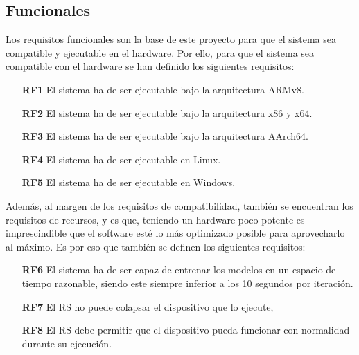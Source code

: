 \subsection{Funcionales}
Los requisitos funcionales son la base de este proyecto para que el sistema sea compatible y ejecutable en el hardware. Por ello, para que el sistema sea compatible con el hardware se han definido los siguientes requisitos:
\begin{itemize}
    \item [\textbf{RF1}] El sistema ha de ser ejecutable bajo la arquitectura ARMv8.
    \item [\textbf{RF2}] El sistema ha de ser ejecutable bajo la arquitectura x86 y x64.
    \item [\textbf{RF3}] El sistema ha de ser ejecutable bajo la arquitectura AArch64.
    \item [\textbf{RF4}] El sistema ha de ser ejecutable en Linux.
    \item [\textbf{RF5}] El sistema ha de ser ejecutable en Windows.
\end{itemize}

Además, al margen de los requisitos de compatibilidad, también se encuentran los requisitos de recursos, y es que, teniendo un hardware poco potente es imprescindible que el software esté lo más optimizado posible para aprovecharlo al máximo. Es por eso que también se definen los siguientes requisitos:
\begin{itemize}
    \item [\textbf{RF6}] El sistema ha de ser capaz de entrenar los modelos en un espacio de tiempo razonable, siendo este siempre inferior a los 10 segundos por iteración.
    \item [\textbf{RF7}] El RS no puede colapsar el dispositivo que lo ejecute,
    \item [\textbf{RF8}] El RS debe permitir que el dispositivo pueda funcionar con normalidad durante su ejecución.
\end{itemize}